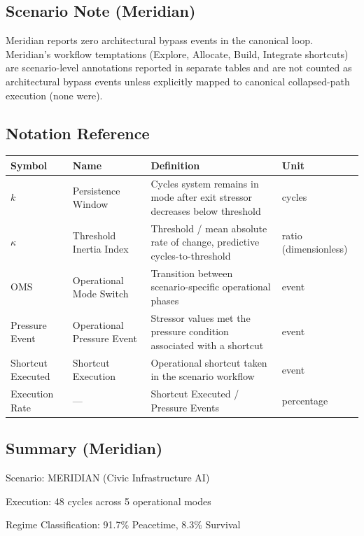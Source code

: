 \documentclass[11pt,a4paper]{article}
\begin{document}
\subsection*{Scenario Note (Meridian)}

Meridian reports zero architectural bypass events in the canonical loop. Meridian's workflow temptations (Explore, Allocate, Build, Integrate shortcuts) are scenario-level annotations reported in separate tables and are not counted as architectural bypass events unless explicitly mapped to canonical collapsed-path execution (none were).

\subsection*{Notation Reference}

\begin{center}
\begin{tabular}{llll}
\toprule
\textbf{Symbol} & \textbf{Name} & \textbf{Definition} & \textbf{Unit} \\
\midrule
$k$ & Persistence Window & Cycles system remains in mode after exit stressor decreases below threshold & cycles \\
$\kappa$ & Threshold Inertia Index & Threshold / mean absolute rate of change, predictive cycles-to-threshold & ratio (dimensionless) \\
OMS & Operational Mode Switch & Transition between scenario-specific operational phases & event \\
Pressure Event & Operational Pressure Event & Stressor values met the pressure condition associated with a shortcut & event \\
Shortcut Executed & Shortcut Execution & Operational shortcut taken in the scenario workflow & event \\
Execution Rate & --- & Shortcut Executed / Pressure Events & percentage \\
\bottomrule
\end{tabular}
\end{center}

\subsection*{Summary (Meridian)}

Scenario: MERIDIAN (Civic Infrastructure AI)

Execution: 48 cycles across 5 operational modes

Regime Classification: 91.7\% Peacetime, 8.3\% Survival
\end{document}
